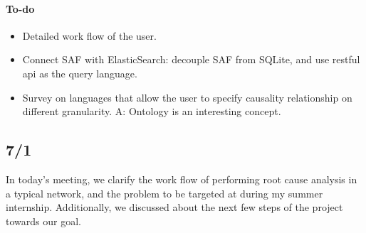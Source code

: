 \documentclass{article}
\begin{document}
\paragraph{To-do}

\begin{itemize}
\item Detailed work flow of the user.
\item Connect SAF with ElasticSearch: decouple SAF from SQLite, and use restful
  api as the query language.
\item Survey on languages that allow the user to specify causality relationship
  on different granularity.
A: Ontology is an interesting concept. 
\end{itemize}

\subsection{7/1}
\label{sec:meeting:624}

In today's meeting, we clarify the work flow of performing root cause analysis
in a typical network, and the problem to be targeted at during my summer
internship. Additionally, we discussed about the next few steps of the project
towards our goal.
\end{document}
